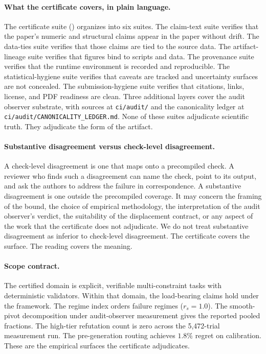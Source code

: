 \paragraph{What the certificate covers, in plain language.}
The certificate suite () organizes into six suites. The claim-text suite verifies that the paper's numeric and structural claims appear in the paper without drift. The data-ties suite verifies that those claims are tied to the source data. The artifact-lineage suite verifies that figures bind to scripts and data. The provenance suite verifies that the runtime environment is recorded and reproducible. The statistical-hygiene suite verifies that caveats are tracked and uncertainty surfaces are not concealed. The submission-hygiene suite verifies that citations, links, license, and PDF readiness are clean. Three additional layers cover the audit observer substrate, with sources at \texttt{ci/audit/} and the canonicality ledger at \texttt{ci/audit/CANONICALITY\_LEDGER.md}. None of these suites adjudicate scientific truth. They adjudicate the form of the artifact.

\paragraph{Substantive disagreement versus check-level disagreement.}
A check-level disagreement is one that maps onto a precompiled check. A reviewer who finds such a disagreement can name the check, point to its output, and ask the authors to address the failure in correspondence. A substantive disagreement is one outside the precompiled coverage. It may concern the framing of the bound, the choice of empirical methodology, the interpretation of the audit observer's verdict, the suitability of the displacement contract, or any aspect of the work that the certificate does not adjudicate. We do not treat substantive disagreement as inferior to check-level disagreement. The certificate covers the surface. The reading covers the meaning.

\paragraph{Scope contract.}
The certified domain is explicit, verifiable multi-constraint tasks with deterministic validators. Within that domain, the load-bearing claims hold under the framework. The regime index orders failure regimes ($r_s = 1.0$). The smooth-pivot decomposition under audit-observer measurement gives the reported pooled fractions. The high-tier refutation count is zero across the 5{,}472-trial measurement run. The pre-generation routing achieves $1.8\%$ regret on calibration. These are the empirical surfaces the certificate adjudicates.

